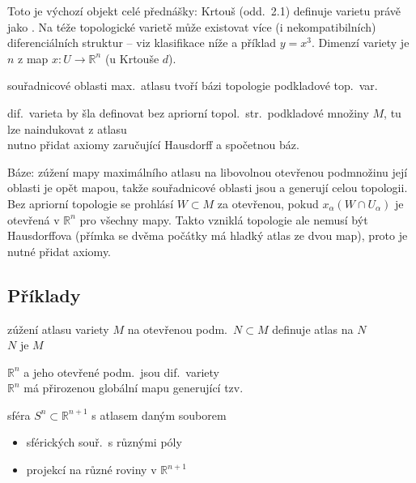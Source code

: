\begin{vysvetleni}
Toto je výchozí objekt celé přednášky: Krtouš (odd.~2.1) definuje varietu právě jako . Na téže topologické varietě může existovat více (i nekompatibilních) diferenciálních struktur -- viz klasifikace níže a příklad $y=x^3$. Dimenzí variety je $n$ z map $x:U\to\mathbb{R}^n$ (u Krtouše $d$).
\end{vysvetleni}

souřadnicové oblasti max.\ atlasu tvoří bázi topologie podkladové top.\ var.

dif.\ varieta by šla definovat bez apriorní topol.\ str.\ podkladové množiny $M$, tu lze nainduko\-vat z atlasu \\
\quad nutno přidat axiomy zaručující Hausdorff a spočetnou báz.

\begin{vysvetleni}
Báze: zúžení mapy maximálního atlasu na libovolnou otevřenou podmnožinu její oblasti je opět mapou, takže souřadnicové oblasti jsou  a generují celou topologii. Bez apriorní topologie se prohlásí $W\subset M$ za otevřenou, pokud $x_\alpha(W\cap U_\alpha)$ je otevřená v $\mathbb{R}^n$ pro všechny mapy. Takto vzniklá topologie ale nemusí být Hausdorffova (přímka se dvěma počátky má hladký atlas ze dvou map), proto je nutné přidat axiomy.
\end{vysvetleni}

\subsection*{Příklady}

\begin{priklad}
zúžení atlasu variety $M$ na otevřenou podm.\ $N\subset M$ definuje atlas na $N$ \\
\quad $N$ je  $M$
\end{priklad}

\begin{priklad}[Př: $\mathbb{R}^n$]
$\mathbb{R}^n$ a jeho otevřené podm.\ jsou dif.\ variety \\
\quad $\mathbb{R}^n$ má přirozenou globální mapu generující tzv.\ 
\end{priklad}

\begin{priklad}[Př: sféra]
sféra $S^n\subset\mathbb{R}^{n+1}$ s atlasem daným souborem
\begin{itemize}[nosep]
  \item[--] sférických souř.\ s různými póly
  \item[--] projekcí na různé roviny v $\mathbb{R}^{n+1}$
\end{itemize}
\end{priklad}

